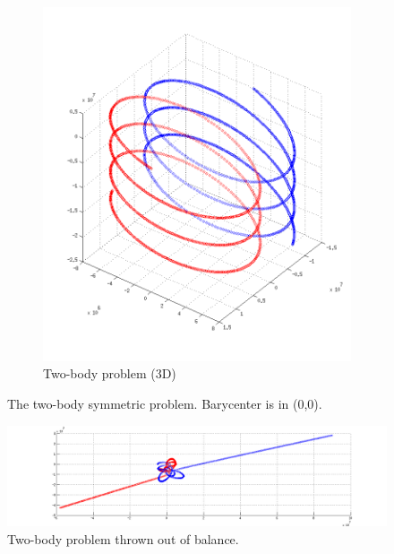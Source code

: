 \documentclass{article}
\begin{document}
\begin{figure}[H]
\begin{subfigure}[b]{0.3\textwidth}
                \includegraphics[width=\textwidth]{img/binar_3d}
                \caption{Two-body problem (3D)}
                \label{fig:satgeo}
        \end{subfigure}
        \caption{The two-body symmetric problem. Barycenter is in (0,0).}\label{fig:twobody}
\end{figure}

\begin{figure}[H]
  \centering
  \includegraphics[width=1\textwidth]{img/g_k}
  \caption{Two-body problem thrown out of balance.}\label{fig:gk}
\end{figure}
\end{document}
